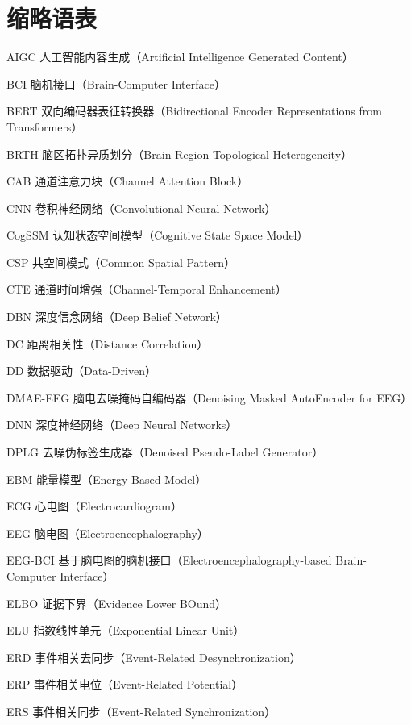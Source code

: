 \chapter*{缩略语表}

\begin{denotation}

\item[AIGC] 人工智能内容生成（Artificial Intelligence Generated Content）
\item[BCI] 脑机接口（Brain-Computer Interface）
\item[BERT] 双向编码器表征转换器（Bidirectional Encoder Representations from Transformers）
\item[BRTH] 脑区拓扑异质划分（Brain Region Topological Heterogeneity）
\item[CAB] 通道注意力块（Channel Attention Block）
\item[CNN] 卷积神经网络（Convolutional Neural Network）
\item[CogSSM] 认知状态空间模型（Cognitive State Space Model）
\item[CSP] 共空间模式（Common Spatial Pattern）
\item[CTE] 通道时间增强（Channel-Temporal Enhancement）
\item[DBN] 深度信念网络（Deep Belief Network）
\item[DC] 距离相关性（Distance Correlation）
\item[DD] 数据驱动（Data-Driven）
\item[DMAE-EEG] 脑电去噪掩码自编码器（Denoising Masked AutoEncoder for EEG）
\item[DNN] 深度神经网络（Deep Neural Networks）
\item[DPLG] 去噪伪标签生成器（Denoised Pseudo-Label Generator）
\item[EBM] 能量模型（Energy-Based Model）
\item[ECG] 心电图（Electrocardiogram）
\item[EEG] 脑电图（Electroencephalography）
\item[EEG-BCI] 基于脑电图的脑机接口（Electroencephalography-based Brain-Computer Interface）
\item[ELBO] 证据下界（Evidence Lower BOund）
\item[ELU] 指数线性单元（Exponential Linear Unit）
\item[ERD] 事件相关去同步（Event-Related Desynchronization）
\item[ERP] 事件相关电位（Event-Related Potential）
\item[ERS] 事件相关同步（Event-Related Synchronization）

\end{denotation}
